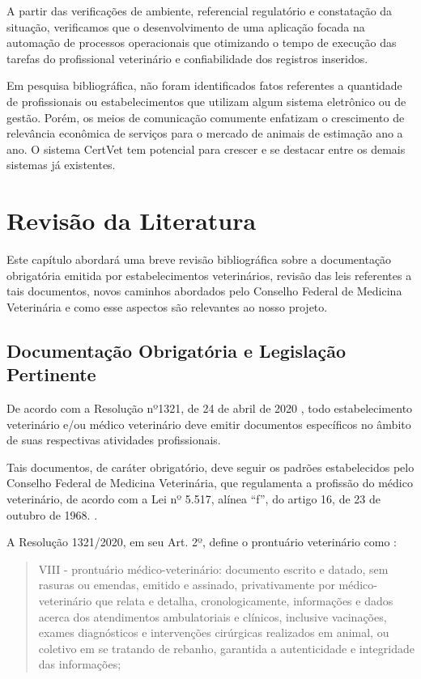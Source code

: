 \documentclass[
    12pt,               %
    openright,          %
    oneside,
    a4paper,            %
    BIBLATEX,           %
    TODO,               %
    english,            %
    brazil              %
    ]{ifsp-spo-inf-ctds}
\begin{document}
    A partir das verificações de ambiente, referencial regulatório e constatação da situação, verificamos que o desenvolvimento de uma aplicação focada na automação de processos operacionais que otimizando o tempo de execução das tarefas do profissional veterinário e confiabilidade dos registros inseridos.
    
    Em pesquisa bibliográfica, não foram identificados fatos referentes a quantidade de profissionais ou estabelecimentos que utilizam algum sistema eletrônico ou de gestão. Porém, os meios de comunicação comumente enfatizam o crescimento de relevância econômica de serviços para o mercado de animais de estimação ano a ano. O sistema CertVet tem potencial para crescer e se destacar entre os demais sistemas já existentes.
    

\chapter{Revisão da Literatura}

    Este capítulo abordará uma breve revisão bibliográfica sobre a documentação obrigatória emitida por estabelecimentos veterinários, revisão das leis referentes a tais documentos, novos caminhos abordados pelo Conselho Federal de Medicina Veterinária e como esse aspectos são relevantes ao nosso projeto.


    \section{Documentação Obrigatória e Legislação Pertinente}
    
        De acordo com a Resolução nº1321, de 24 de abril de 2020 \cite {doc_obrig}, todo estabelecimento veterinário e/ou médico veterinário deve emitir documentos específicos no âmbito de suas respectivas atividades profissionais.
        
        Tais documentos, de caráter obrigatório, deve seguir os padrões estabelecidos pelo Conselho Federal de Medicina Veterinária, que regulamenta a profissão do médico veterinário, de acordo com a Lei nº 5.517, alínea “f”, do artigo 16, de 23 de outubro de 1968. \cite {doc_obrig}.
        
        A Resolução 1321/2020, em seu Art. 2º, define o prontuário veterinário como \cite {doc_obrig}: 
    
        \begin{quote}
            VIII - prontuário médico-veterinário: documento escrito e datado, sem rasuras ou emendas, emitido e assinado, privativamente por médico-veterinário que relata e detalha, cronologicamente, informações e dados acerca dos atendimentos ambulatoriais e clínicos, inclusive vacinações, exames diagnósticos e intervenções cirúrgicas realizados em animal, ou coletivo em se tratando de rebanho, garantida a autenticidade e integridade das informações;
        \end{quote}
    
\end{document}
